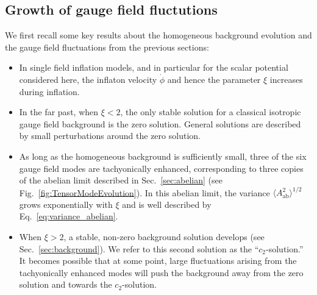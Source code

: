  \subsection{Growth of gauge field fluctutions \label{subsec:gaugefluctuations}}
 
We first recall some key results about the homogeneous background evolution and the gauge field fluctuations from the previous sections:
\begin{itemize}

\item In single field inflation models, and in particular for the scalar potential considered here, the inflaton velocity $\dot \phi$ and hence the parameter $\xi$ increases during inflation.
 
 \item In the far past, when $\xi<2$, the only stable solution for a classical isotropic gauge field background is the zero solution. General solutions are described by small perturbations around the zero solution.
 
  \item As long as the homogeneous background  is sufficiently small, three of the six gauge field modes are tachyonically enhanced, corresponding to three copies of the abelian limit described in Sec.~\ref{sec:abelian} (see Fig.~\ref{fig:TensorModeEvolution}). In this abelian limit, the variance  $\langle A_\text{ab}^2 \rangle^{1/2}$ grows exponentially with $\xi$ and is well described by Eq.~\eqref{eq:variance_abelian}.  

  \item When $\xi > 2$, a stable, non-zero background solution develops (see Sec.~\ref{sec:background}).  We refer to this second solution as the ``$c_2$-solution.'' It becomes possible that at some point, large fluctuations arising from the tachyonically enhanced modes will push the background away from the zero solution and towards the $c_2$-solution. 
 

\end{itemize}
